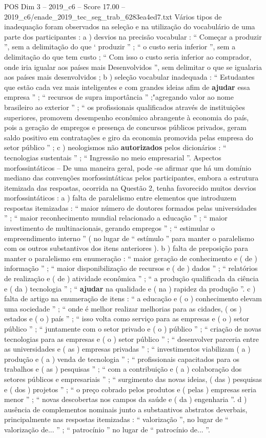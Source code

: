\begin{textsample}{POS Dim 3 – 2019\_c6 – Score 17.00 – 2019\_c6/enade\_2019\_tec\_seg\_trab\_6283ea4ed7.txt}
Vários tipos de inadequação foram observados na seleção e na utilização do vocabulário de uma parte dos participantes : a ) desvios na precisão vocabular : “ Começar a produzir ”, sem a delimitação do que ‘ produzir ” ; “ o custo seria inferior ”, sem a delimitação do que tem custo ; “ Com isso o custo seria inferior ao comprador, onde iria igualar aos países mais Desenvolvidos ”, sem delimitar o que se igualaria aos países mais desenvolvidos ; b ) seleção vocabular inadequada : “ Estudantes que estão cada vez mais inteligentes e com grandes ideias afim de \textbf{ajudar} essa empresa ” ; “ recursos de supra importância ” ;"agregando valor ao nome brasileiro ao exterior ” ; “ os profissionais qualificados através de instituições superiores, promovem desempenho econômico abrangente à economia do país, pois a geração de empregos e presença de concursos públicos privados, geram saldo positivo em contratações e giro da economia promovida pelas empresa do setor público ” ; c ) neologismos não \textbf{autorizados} pelos dicionários : “ tecnologias sustentais ” ; “ Ingressão no meio empresarial ”.
Aspectos morfossintáticos – De uma maneira geral, pode -se afirmar que há um domínio mediano das convenções morfossintáticas pelos participantes, embora a estrutura itemizada das respostas, ocorrida na Questão 2, tenha favorecido muitos desvios morfossintáticos : a ) falta de paralelismo entre elementos que introduzem respostas itemizadas : “ maior número de doutores formados pelas universidades ” ; “ maior reconhecimento mundial relacionado a educação ” ; “ maior investimento de multinacionais, gerando empregos ” ; “ estimular o empreendimento interno ” ( no lugar de “ estímulo ” para manter o paralelismo com os outros substantivos dos itens anteriores ). b ) falta de preposição para manter o paralelismo em enumeração : “ maior geração de conhecimento e ( de ) informação ” ; “ maior disponibilização de recursos e ( de ) dados ” ; “ relatórios de realização e ( de ) atividade econômica ” ; “ a produção qualificada da ciência e ( da ) tecnologia ” ; “ \textbf{ajudar} na qualidade e ( na ) rapidez da produção ”. c ) falta de artigo na enumeração de itens : “ a educação e ( o ) conhecimento elevam uma sociedade ” ; “ onde é melhor realizar melhorias para as cidades, ( os ) estados e ( o ) país ” ; “ isso volta como serviço para as empresas e ( o ) setor público ” ; “ juntamente com o setor privado e ( o ) público ” ; “ criação de novas tecnologias para as empresas e ( o ) setor público ” ; “ desenvolver parceria entre as universidades e ( as ) empresas privadas ” ; “ investimentos viabilizam ( a ) produção e ( a ) venda de tecnologia ” ; “ profissionais capacitados para os trabalhos e ( as ) pesquisas ” ; “ com a contribuição e ( a ) colaboração dos setores públicos e empresariais ” ; “ surgimento das novas ideias, ( das ) pesquisas e ( dos ) projetos ” ; “ o preço cobrado pelos produtos e ( pelas ) empresas seria menor ” ; “ novas descobertas nos campos da saúde e ( da ) engenharia ”. d ) ausência de complementos nominais junto a substantivos abstratos deverbais, principalmente nas respostas itemizadas : “ valorização ”, no lugar de “ valorização de... ” ; “ patrocínio ” no lugar de “ patrocínio de... ”.

\end{textsample}
